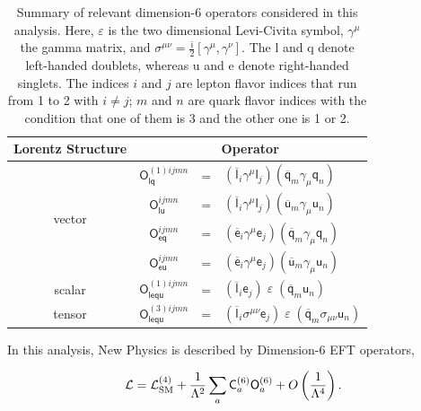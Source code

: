 \begin{table}[t]
\sffamily
\centering
\caption{Summary of relevant dimension-6 operators considered in this analysis. Here, $\varepsilon$ is the two dimensional Levi-Civita symbol, $\gamma^\mu$ the gamma matrix, and $\sigma^{\mu\nu}=\frac{\textsf{i}}{2}[\gamma^\mu,\gamma^\nu]$. The l and q denote left-handed doublets, whereas u and e denote right-handed singlets. The indices $i$ and $j$ are lepton flavor indices that run from 1 to 2 with $i \neq j$; $m$ and $n$ are quark flavor indices with the condition that one of them is 3 and the other one is 1 or 2.}
\begin{tabular}{cccl}
\toprule
Lorentz Structure & \multicolumn{3}{c}{Operator}\\
\midrule
\multirow{4}{*}{vector} & $\textsf{O}_{\textsf{lq}}^{(1)ijmn}$ &=& $(\overline{\textsf{l}}_i\gamma^\mu\textsf{l}_j)
   (\overline{\textsf{q}}_m\gamma_\mu\textsf{q}_n)$
   \\
  & $\textsf{O}_{\textsf{lu}}^{ijmn}$ &=& $(\overline{\textsf{l}}_i\gamma^\mu\textsf{l}_j)
   (\overline{\textsf{u}}_m\gamma_\mu\textsf{u}_n)$
   \\  
  & $\textsf{O}_{\textsf{eq}}^{ijmn}$ &=& $(\overline{\textsf{e}}_i\gamma^\mu\textsf{e}_j)
   (\overline{\textsf{q}}_m\gamma_\mu\textsf{q}_n)$
   \\ 
  & $\textsf{O}_{\textsf{eu}}^{ijmn}$ &=& $(\overline{\textsf{e}}_i\gamma^\mu\textsf{e}_j)
   (\overline{\textsf{u}}_m\gamma_\mu\textsf{u}_n)$
   \\ \midrule
\multirow{1}{*}{scalar}  & $\textsf{O}_{\textsf{lequ}}^{(1)ijmn}$ &=& $(\overline{\textsf{l}}_i\textsf{e}_j)\;\varepsilon\;
   (\overline{\textsf{q}}_m\textsf{u}_n)$
   \\ 
 \multirow{1}{*}{tensor} & $\textsf{O}_{\textsf{lequ}}^{(3)ijmn}$ &=& $(\overline{\textsf{l}}_i \sigma^{\mu\nu}\textsf{e}_j)\;\varepsilon\;
   (\overline{\textsf{q}}_m\sigma_{\mu\nu}\textsf{u}_n)$
  \\ \bottomrule
\end{tabular}
\label{tab:dimension6}
\end{table}

In this analysis, New Physics  is described by Dimension-6 \ac{EFT} operators,

\begin{equation}
\label{eq:0}
\mathcal{L}=\mathcal{L}_{\text{SM}}^{(4)} + \frac{1}{\mathrm{\Lambda}^2}\sum_{a}\textsf{C}^{(6)}_{a}\textsf{O}^{(6)}_{a}+O\left( \frac{1}{\mathrm{\Lambda}^4}\right).
\end{equation}  


